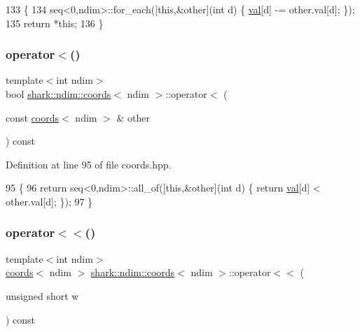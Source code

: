\begin{DoxyCode}
133                                                                                \{
134             seq<0,ndim>::for\_each([\textcolor{keyword}{this},&other](\textcolor{keywordtype}{int} d) \{ \hyperlink{structshark_1_1ndim_1_1coords_a425262af388367b0f0079218e038aef5}{val}[d] -= other.val[d]; \});
135             \textcolor{keywordflow}{return} *\textcolor{keyword}{this};
136         \}
\end{DoxyCode}
\hypertarget{structshark_1_1ndim_1_1coords_a2dadd54e3584169adb3ecc53af004cba}{}\label{structshark_1_1ndim_1_1coords_a2dadd54e3584169adb3ecc53af004cba} 
\subsubsection{\texorpdfstring{operator$<$()}{operator<()}}
{\footnotesize\ttfamily template$<$int ndim$>$ \\
bool \hyperlink{structshark_1_1ndim_1_1coords}{shark\+::ndim\+::coords}$<$ ndim $>$\+::operator$<$ (\begin{DoxyParamCaption}\item[{const \hyperlink{structshark_1_1ndim_1_1coords}{coords}$<$ ndim $>$ \&}]{other }\end{DoxyParamCaption}) const\hspace{0.3cm}{\ttfamily [inline]}}



Definition at line 95 of file coords.\+hpp.


\begin{DoxyCode}
95                                                                            \{
96             \textcolor{keywordflow}{return} seq<0,ndim>::all\_of([\textcolor{keyword}{this},&other](\textcolor{keywordtype}{int} d) \{ \textcolor{keywordflow}{return} \hyperlink{structshark_1_1ndim_1_1coords_a425262af388367b0f0079218e038aef5}{val}[d] < other.val[d]; \});
97         \}
\end{DoxyCode}
\hypertarget{structshark_1_1ndim_1_1coords_a71ac780cdfa0eb56845de085db1245d8}{}\label{structshark_1_1ndim_1_1coords_a71ac780cdfa0eb56845de085db1245d8} 
\subsubsection{\texorpdfstring{operator$<$$<$()}{operator<<()}}
{\footnotesize\ttfamily template$<$int ndim$>$ \\
\hyperlink{structshark_1_1ndim_1_1coords}{coords}$<$ ndim $>$ \hyperlink{structshark_1_1ndim_1_1coords}{shark\+::ndim\+::coords}$<$ ndim $>$\+::operator$<$$<$ (\begin{DoxyParamCaption}\item[{unsigned short}]{w }\end{DoxyParamCaption}) const\hspace{0.3cm}{\ttfamily [inline]}}



